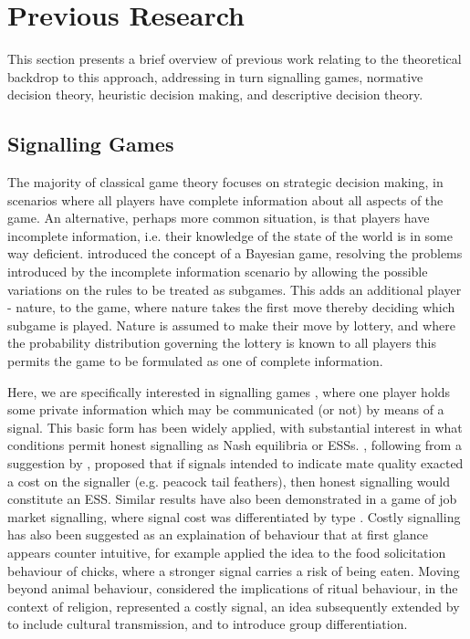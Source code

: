 \section{Previous Research}

\label{sec:lit_review}

This section presents a brief overview of previous work relating to the theoretical backdrop to this approach, addressing in turn signalling games, normative decision theory, heuristic decision making, and descriptive decision theory.


\subsection{Signalling Games}

The majority of classical game theory focuses on strategic decision making, in scenarios where all players have complete information about all aspects of the game. An alternative, perhaps more common situation, is that players have incomplete information, i.e. their knowledge of the state of the world is in some way deficient. \citet{Harsanyi1967} introduced the concept of a Bayesian game, resolving the problems introduced by the incomplete information scenario by allowing the possible variations on the rules to be treated as subgames. This adds an additional player - nature, to the game, where nature takes the first move thereby deciding which subgame is played. Nature is assumed to make their move by lottery, and where the probability distribution governing the lottery is known to all players this permits the game to be formulated as one of complete information. 

Here, we are specifically interested in signalling games \citep{Spence1973,Kreps1987}, where one player holds some private information which may be communicated (or not) by means of a signal.
This basic form has been widely applied, with substantial interest in what conditions permit honest signalling as Nash equilibria or \acp{ESS}. \citet{Grafen1990}, following from a suggestion by \citet{Zahavi1975}, proposed that if signals intended to indicate mate quality exacted a cost on the signaller (e.g. peacock tail feathers), then honest signalling would constitute an \ac{ESS}. Similar results have also been demonstrated in a game of job market signalling, where signal cost was differentiated by type \citep{Spence1973}. 
Costly signalling has also been suggested as an explaination of behaviour that at first glance appears counter intuitive, for example \citet{Godfray1991} applied the idea to the food solicitation behaviour of chicks, where a stronger signal carries a risk of being eaten. Moving beyond animal behaviour, \citet{Sosis2003} considered the implications of ritual behaviour, in the context of religion, represented a costly signal, an idea subsequently extended by \citet{Henrich2009} to include cultural transmission, and \citet{Wildman2011} to introduce group differentiation.

